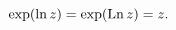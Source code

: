 \[\mathop{\exp\/}\nolimits\!\left(\mathop{\ln\/}\nolimits z\right)=\mathop{\exp%
\/}\nolimits\!\left(\mathop{\mathrm{Ln}\/}\nolimits z\right)=z.\]